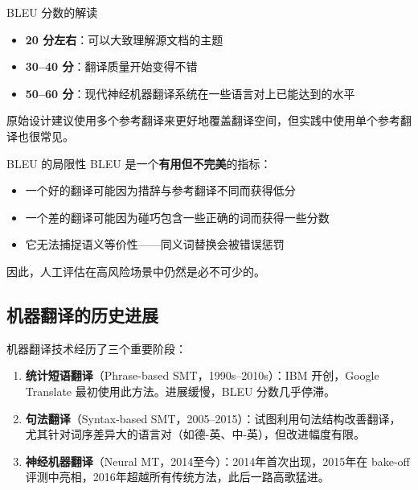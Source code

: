 \documentclass[a4paper]{article}
\begin{document}



\begin{knowledgebox}{BLEU 分数的解读}
\begin{itemize}
    \item \textbf{20 分左右}：可以大致理解源文档的主题
    \item \textbf{30--40 分}：翻译质量开始变得不错
    \item \textbf{50--60 分}：现代神经机器翻译系统在一些语言对上已能达到的水平
\end{itemize}
原始设计建议使用多个参考翻译来更好地覆盖翻译空间，但实践中使用单个参考翻译也很常见。
\end{knowledgebox}

\begin{warningbox}{BLEU 的局限性}
BLEU 是一个\textbf{有用但不完美}的指标：
\begin{itemize}
    \item 一个好的翻译可能因为措辞与参考翻译不同而获得低分
    \item 一个差的翻译可能因为碰巧包含一些正确的词而获得一些分数
    \item 它无法捕捉语义等价性——同义词替换会被错误惩罚
\end{itemize}
因此，人工评估在高风险场景中仍然是必不可少的。
\end{warningbox}

\subsection{机器翻译的历史进展}





机器翻译技术经历了三个重要阶段：

\begin{enumerate}
    \item \textbf{统计短语翻译}（Phrase-based SMT，1990s--2010s）：IBM 开创，Google Translate 最初使用此方法。进展缓慢，BLEU 分数几乎停滞。
    \item \textbf{句法翻译}（Syntax-based SMT，2005--2015）：试图利用句法结构改善翻译，尤其针对词序差异大的语言对（如德-英、中-英），但改进幅度有限。
    \item \textbf{神经机器翻译}（Neural MT，2014至今）：2014年首次出现，2015年在 bake-off 评测中亮相，2016年超越所有传统方法，此后一路高歌猛进。
\end{enumerate}
\end{document}
